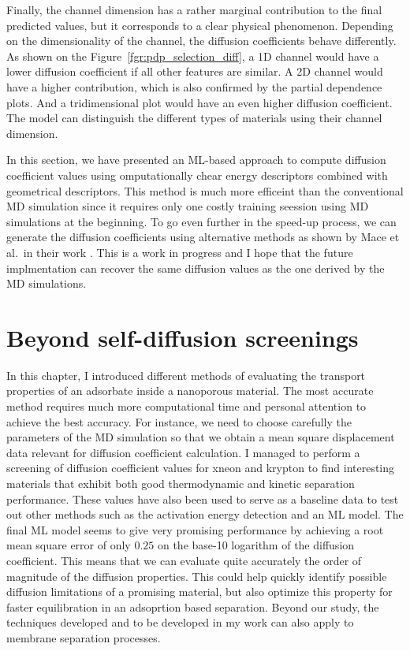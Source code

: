 \documentclass[main]{subfiles}
\begin{document}
Finally, the channel dimension has a rather marginal contribution to the final predicted values, but it corresponds to a clear physical phenomenon. Depending on the dimensionality of the channel, the diffusion coefficients behave differently. As shown on the Figure~\ref{fgr:pdp_selection_diff}, a 1D channel would have a lower diffusion coefficient if all other features are similar. A 2D channel would have a higher contribution, which is also confirmed by the partial dependence plots. And a tridimensional plot would have an even higher diffusion coefficient. The model can distinguish the different types of materials using their channel dimension.

In this section, we have presented an ML-based approach to compute diffusion coefficient values using omputationally chear energy descriptors combined with geometrical descriptors. This method is much more efficeint than the conventional MD simulation since it requires only one costly training seession using MD simulations at the beginning. To go even further in the speed-up process, we can generate the diffusion coefficients using alternative methods as shown by Mace et al.\ in their work \autocite{Mace_2019}. This is a work in progress and I hope that the future implmentation can recover the same diffusion values as the one derived by the MD simulations.


\section{Beyond self-diffusion screenings}

In this chapter, I introduced different methods of evaluating the transport properties of an adsorbate inside a nanoporous material. The most accurate method requires much more computational time and personal attention to achieve the best accuracy. For instance, we need to choose carefully the parameters of the MD simulation so that we obtain a mean square displacement data relevant for diffusion coefficient calculation. I managed to perform a screening of diffusion coefficient values for xneon and krypton to find interesting materials that exhibit both good thermodynamic and kinetic separation performance. These values have also been used to serve as a baseline data to test out other methods such as the activation energy detection and an ML model. The final ML model seems to give very promising performance by achieving a root mean square error of only $0.25$ on the base-10 logarithm of the diffusion coefficient. This means that we can evaluate quite accurately the order of magnitude of the diffusion properties. This could help quickly identify possible diffusion limitations of a promising material, but also optimize this property for faster equilibration in an adsoprtion based separation. Beyond our study, the techniques developed and to be developed in my work can also apply to membrane separation processes.
\end{document}
